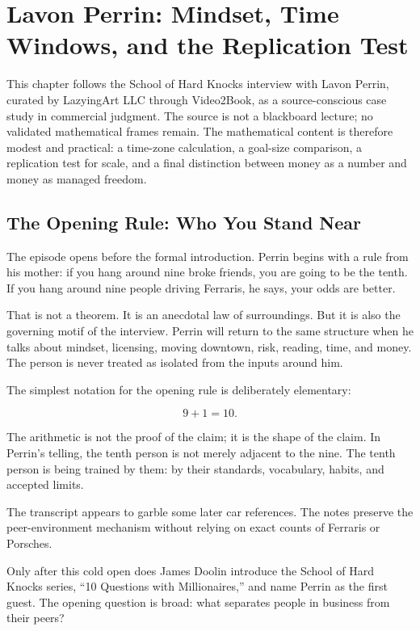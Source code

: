 \chapter{Lavon Perrin: Mindset, Time Windows, and the Replication Test}

This chapter follows the School of Hard Knocks interview with Lavon Perrin, curated by LazyingArt LLC through Video2Book, as a source-conscious case study in commercial judgment. The source is not a blackboard lecture; no validated mathematical frames remain. The mathematical content is therefore modest and practical: a time-zone calculation, a goal-size comparison, a replication test for scale, and a final distinction between money as a number and money as managed freedom.

\section{The Opening Rule: Who You Stand Near}

The episode opens before the formal introduction. Perrin begins with a rule from his mother: if you hang around nine broke friends, you are going to be the tenth. If you hang around nine people driving Ferraris, he says, your odds are better.

That is not a theorem. It is an anecdotal law of surroundings. But it is also the governing motif of the interview. Perrin will return to the same structure when he talks about mindset, licensing, moving downtown, risk, reading, time, and money. The person is never treated as isolated from the inputs around him.

The simplest notation for the opening rule is deliberately elementary:

\begin{equation}
9+1=10.
\end{equation}

The arithmetic is not the proof of the claim; it is the shape of the claim. In Perrin's telling, the tenth person is not merely adjacent to the nine. The tenth person is being trained by them: by their standards, vocabulary, habits, and accepted limits.

\begin{remark}
The transcript appears to garble some later car references. The notes preserve the peer-environment mechanism without relying on exact counts of Ferraris or Porsches.
\end{remark}

Only after this cold open does James Doolin introduce the School of Hard Knocks series, ``10 Questions with Millionaires,'' and name Perrin as the first guest. The opening question is broad: what separates people in business from their peers?


